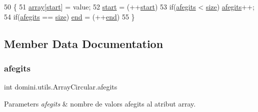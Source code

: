 \begin{DoxyCode}
50     \{
51         \hyperlink{classdomini_1_1utils_1_1ArrayCircular_a2af77a58adf605b58d79a1879a0a593f}{array}[\hyperlink{classdomini_1_1utils_1_1ArrayCircular_a5206ac4a02c25c16c8a8ed50f65ea87b}{start}] = value;
52         \hyperlink{classdomini_1_1utils_1_1ArrayCircular_a5206ac4a02c25c16c8a8ed50f65ea87b}{start} = (++\hyperlink{classdomini_1_1utils_1_1ArrayCircular_a5206ac4a02c25c16c8a8ed50f65ea87b}{start})%
53         \textcolor{keywordflow}{if}(\hyperlink{classdomini_1_1utils_1_1ArrayCircular_a08291d877b2d4c71c219df6f983b279a}{afegits} < \hyperlink{classdomini_1_1utils_1_1ArrayCircular_a1ffca5e28ff4dc515eddde9cd5926efd}{size}) \hyperlink{classdomini_1_1utils_1_1ArrayCircular_a08291d877b2d4c71c219df6f983b279a}{afegits}++;
54         \textcolor{keywordflow}{if}(\hyperlink{classdomini_1_1utils_1_1ArrayCircular_a08291d877b2d4c71c219df6f983b279a}{afegits} == \hyperlink{classdomini_1_1utils_1_1ArrayCircular_a1ffca5e28ff4dc515eddde9cd5926efd}{size}) \hyperlink{classdomini_1_1utils_1_1ArrayCircular_ad3f40ecb62a2503382fa5d1fa2025912}{end} = (++\hyperlink{classdomini_1_1utils_1_1ArrayCircular_ad3f40ecb62a2503382fa5d1fa2025912}{end})%
55     \}
\end{DoxyCode}


\subsection{Member Data Documentation}
\mbox{\label{classdomini_1_1utils_1_1ArrayCircular_a08291d877b2d4c71c219df6f983b279a}} 
\subsubsection{\texorpdfstring{afegits}{afegits}}
{\footnotesize\ttfamily int domini.\+utils.\+Array\+Circular.\+afegits\hspace{0.3cm}{\ttfamily [private]}}


\begin{DoxyParams}{Parameters}
{\em afegits} & nombre de valors afegits al atribut array. \\
\hline
\end{DoxyParams}
\mbox{\label{classdomini_1_1utils_1_1ArrayCircular_a2af77a58adf605b58d79a1879a0a593f}} 
